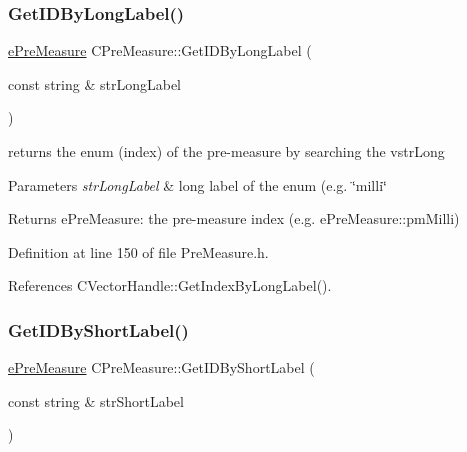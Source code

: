 \mbox{\label{classCPreMeasure_a5c47dca5a6bc34def68e6a2c7b4c5caa}} 
\subsubsection{\texorpdfstring{Get\+I\+D\+By\+Long\+Label()}{GetIDByLongLabel()}}
{\footnotesize\ttfamily \hyperlink{PreMeasure_8h_a6c81167b8d4c2badde42f81cb7214620}{e\+Pre\+Measure} C\+Pre\+Measure\+::\+Get\+I\+D\+By\+Long\+Label (\begin{DoxyParamCaption}\item[{const string \&}]{str\+Long\+Label }\end{DoxyParamCaption})\hspace{0.3cm}{\ttfamily [inline]}}



returns the enum (index) of the pre-\/measure by searching the vstr\+Long 


\begin{DoxyParams}{Parameters}
{\em str\+Long\+Label} & long label of the enum (e.\+g. \char`\"{}milli\char`\"{} \\
\hline
\end{DoxyParams}
\begin{DoxyReturn}{Returns}
e\+Pre\+Measure\+: the pre-\/measure index (e.\+g. e\+Pre\+Measure\+::pm\+Milli) 
\end{DoxyReturn}


Definition at line 150 of file Pre\+Measure.\+h.



References C\+Vector\+Handle\+::\+Get\+Index\+By\+Long\+Label().

\mbox{\label{classCPreMeasure_a6d9ee00647db5c9cb13e229c375096f8}} 
\subsubsection{\texorpdfstring{Get\+I\+D\+By\+Short\+Label()}{GetIDByShortLabel()}}
{\footnotesize\ttfamily \hyperlink{PreMeasure_8h_a6c81167b8d4c2badde42f81cb7214620}{e\+Pre\+Measure} C\+Pre\+Measure\+::\+Get\+I\+D\+By\+Short\+Label (\begin{DoxyParamCaption}\item[{const string \&}]{str\+Short\+Label }\end{DoxyParamCaption})\hspace{0.3cm}{\ttfamily [inline]}}



